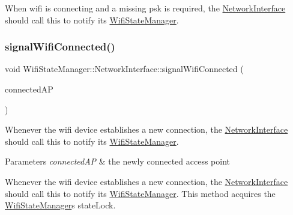 When wifi is connecting and a missing psk is required, the \mbox{\hyperlink{classWifiStateManager_1_1NetworkInterface}{Network\+Interface}} should call this to notify its \mbox{\hyperlink{classWifiStateManager}{Wifi\+State\+Manager}}. \mbox{\label{classWifiStateManager_1_1NetworkInterface_af7a140260780ce451d022e19329494a2}} 
\subsubsection{\texorpdfstring{signal\+Wifi\+Connected()}{signalWifiConnected()}}
{\footnotesize\ttfamily void Wifi\+State\+Manager\+::\+Network\+Interface\+::signal\+Wifi\+Connected (\begin{DoxyParamCaption}\item[{\mbox{\hyperlink{classWifiAccessPoint_ad18977f884076774803027efbaa131a0}{Wifi\+Access\+Point\+::\+Ptr}}}]{connected\+AP }\end{DoxyParamCaption})\hspace{0.3cm}{\ttfamily [protected]}}

Whenever the wifi device establishes a new connection, the \mbox{\hyperlink{classWifiStateManager_1_1NetworkInterface}{Network\+Interface}} should call this to notify its \mbox{\hyperlink{classWifiStateManager}{Wifi\+State\+Manager}}.


\begin{DoxyParams}{Parameters}
{\em connected\+AP} & the newly connected access point\\
\hline
\end{DoxyParams}
Whenever the wifi device establishes a new connection, the \mbox{\hyperlink{classWifiStateManager_1_1NetworkInterface}{Network\+Interface}} should call this to notify its \mbox{\hyperlink{classWifiStateManager}{Wifi\+State\+Manager}}. This method acquires the \mbox{\hyperlink{classWifiStateManager}{Wifi\+State\+Manager}}\textquotesingle{}s state\+Lock. \mbox{\label{classWifiStateManager_1_1NetworkInterface_a3ce3bfd90ed3f746ab1c4b9f73c97495}} 
